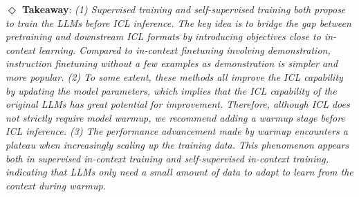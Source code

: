 \textbf{$\Diamond$ Takeaway}: \textit{
(1) Supervised training and self-supervised training both propose to train the LLMs before ICL inference. The key idea is to bridge the gap between pretraining and downstream ICL formats by introducing objectives close to in-context learning. Compared to in-context finetuning involving demonstration, instruction finetuning without a few examples as demonstration is simpler and more popular.  %
(2) To some extent, these methods all improve the ICL capability by updating the model parameters, which implies that the ICL capability of the original LLMs has great potential for improvement. Therefore, although ICL does not strictly require model warmup, we recommend adding a warmup stage before ICL inference.
(3) 
The performance advancement made by warmup encounters a plateau when increasingly scaling up the training data. This phenomenon appears both in supervised in-context training and self-supervised in-context training, indicating that LLMs only need a small amount of data to adapt to learn from the context during warmup.
}
